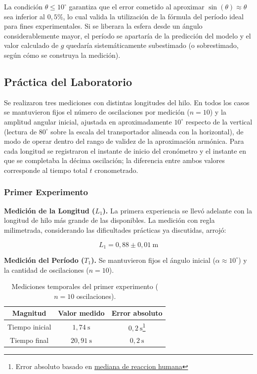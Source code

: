 La condición $\theta \leq 10^\circ$ garantiza que el error cometido al aproximar $\sin(\theta) \approx \theta$ sea inferior al $0{,}5\%$, lo cual valida la utilización de la fórmula del período ideal para fines experimentales. Si se liberara la esfera desde un ángulo considerablemente mayor, el período se apartaría de la predicción del modelo y el valor calculado de $g$ quedaría sistemáticamente subestimado (o sobrestimado, según cómo se construya la medición).

\subsection{Práctica del Laboratorio}

Se realizaron tres mediciones con distintas longitudes del hilo. En todos los casos se mantuvieron fijos el número de oscilaciones por medición ($n = 10$) y la amplitud angular inicial, ajustada en aproximadamente $10^\circ$ respecto de la vertical (lectura de $80^\circ$ sobre la escala del transportador alineada con la horizontal), de modo de operar dentro del rango de validez de la aproximación armónica. Para cada longitud se registraron el instante de inicio del cronómetro y el instante en que se completaba la décima oscilación; la diferencia entre ambos valores corresponde al tiempo total $t$ cronometrado.

\subsubsection{Primer Experimento}

\textbf{Medición de la Longitud ($L_1$).} La primera experiencia se llevó adelante con la longitud de hilo más grande de las disponibles. La medición con regla milimetrada, considerando las dificultades prácticas ya discutidas, arrojó:

\[
L_1 = 0{,}88 \pm 0{,}01\ \mathrm{m}
\]

\textbf{Medición del Período ($T_1$).} Se mantuvieron fijos el ángulo inicial ($\alpha \approx 10^\circ$) y la cantidad de oscilaciones ($n = 10$).

\begin{table}[h!]
\centering
\begin{tabular}{|c|c|c|}
\hline
\textbf{Magnitud} & \textbf{Valor medido} & \textbf{Error absoluto} \\ \hline
Tiempo inicial   & $1{,}74\ \mathrm{s}$  & $0{,}2\ \mathrm{s}$\footnote{Error absoluto basado en \href{https://humanbenchmark.com/tests/reactiontime}{mediana de reaccion humana}}  \\ \hline
Tiempo final     & $20{,}91\ \mathrm{s}$ & $0{,}2\ \mathrm{s}$  \\ \hline
\end{tabular}
\caption{Mediciones temporales del primer experimento ($n = 10$ oscilaciones).}

\end{table}

